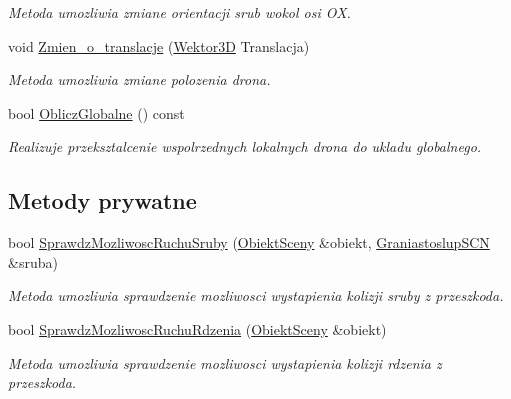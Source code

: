 \begin{DoxyCompactItemize}
\begin{DoxyCompactList}\small\item\em Metoda umozliwia zmiane orientacji srub wokol osi OX. \end{DoxyCompactList}\item 
void \hyperlink{classDron_a5f5867d7f7adb7e540ef762a782a4103}{Zmien\+\_\+o\+\_\+translacje} (\hyperlink{classSWektor}{Wektor3D} Translacja)
\begin{DoxyCompactList}\small\item\em Metoda umozliwia zmiane polozenia drona. \end{DoxyCompactList}\item 
bool \hyperlink{classDron_ac0c17bd50d8f7c11457ab69cb2237abb}{Oblicz\+Globalne} () const
\begin{DoxyCompactList}\small\item\em Realizuje przeksztalcenie wspolrzednych lokalnych drona do ukladu globalnego. \end{DoxyCompactList}\end{DoxyCompactItemize}
\subsection*{Metody prywatne}
\begin{DoxyCompactItemize}
\item 
bool \hyperlink{classDron_a0d88b00af782f5e914887b2b089e1b9c}{Sprawdz\+Mozliwosc\+Ruchu\+Sruby} (\hyperlink{classObiektSceny}{Obiekt\+Sceny} \&obiekt, \hyperlink{classGraniastoslupSCN}{Graniastoslup\+S\+CN} \&sruba)
\begin{DoxyCompactList}\small\item\em Metoda umozliwia sprawdzenie mozliwosci wystapienia kolizji sruby z przeszkoda. \end{DoxyCompactList}\item 
bool \hyperlink{classDron_a4cff7a2c46fe43e32df58c8245d9d0d3}{Sprawdz\+Mozliwosc\+Ruchu\+Rdzenia} (\hyperlink{classObiektSceny}{Obiekt\+Sceny} \&obiekt)
\begin{DoxyCompactList}\small\item\em Metoda umozliwia sprawdzenie mozliwosci wystapienia kolizji rdzenia z przeszkoda. \end{DoxyCompactList}\end{DoxyCompactItemize}
